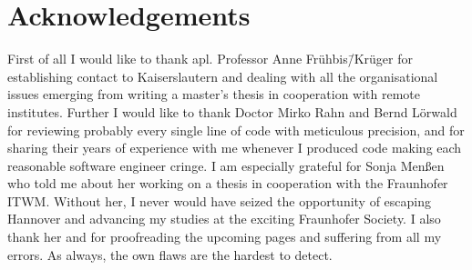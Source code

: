 \chapter*{Acknowledgements}

First of all I would like to thank apl. Professor Anne Frühbis\=/Krüger for establishing contact to Kaiserslautern and dealing with all the organisational issues emerging from writing a master's thesis in cooperation with remote institutes. Further I would like to thank Doctor Mirko Rahn and Bernd Lörwald for reviewing probably every single line of code with meticulous precision, and for sharing their years of experience with me whenever I produced code making each reasonable software engineer cringe. I am especially grateful for Sonja Menßen who told me about her working on a thesis in cooperation with the \acl{Fraunhofer ITWM}. Without her, I never would have seized the opportunity of escaping Hannover and advancing my studies at the exciting Fraunhofer Society. I also thank her and  for proofreading the upcoming pages and suffering from all my errors. As always, the own flaws are the hardest to detect.